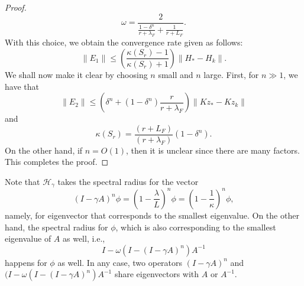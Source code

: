 \begin{proof}
\begin{equation}
\omega = \frac{2}{\frac{1 - \delta^n}{r + \lambda_F} + \frac{1}{r+L_F}}. 
\end{equation} 
With this choice, we obtain the convergence rate given as follows: 
\begin{equation}
\|E_1\| \leq \left ( \frac{\kappa(S_r) - 1}{\kappa(S_r) + 1} \right ) \|H_* - H_k\|. 
\end{equation} 
We shall now make it clear by choosing $n$ small and $n$ large. First, for $n \gg 1$, we have that
\begin{equation}
\|E_2\| \leq \left ( \delta^n + (1 - \delta^n)\frac{r}{r+\lambda_F} \right ) \|Kz_* - Kz_k\| 
\end{equation}
and 
\begin{equation}
\kappa(S_{r}) = \frac{(r+L_F)}{(r+\lambda_F)} (1 - \delta^n).  
\end{equation} 
On the other hand, if $n = O(1)$, then it is unclear since there are many factors. This completes the proof. 
\end{proof} 
\begin{remark}
Note that $\mathcal{H}_\gamma$ takes the spectral radius for the vector 
\begin{equation}
(I - \gamma A)^n \phi = \left ( 1 - \frac{\lambda}{L} \right )^n \phi = \left (1 - \frac{1}{\kappa} \right )^n \phi, 
\end{equation}
namely, for eigenvector that corresponds to the smallest eigenvalue. On the other hand, the spectral radius for $\phi$, which is also corresponding to the smallest eigenvalue of $A$ as well, i.e., 
\begin{equation}
I - \omega (I - (I - \gamma A)^n) A^{-1} 
\end{equation}
happens for $\phi$ as well. In any case, two operators $(I - \gamma A)^n$ and $(I - \omega (I - (I - \gamma A)^n)A^{-1}$ share eigenvectors with $A$ or $A^{-1}$. 
\end{remark}


